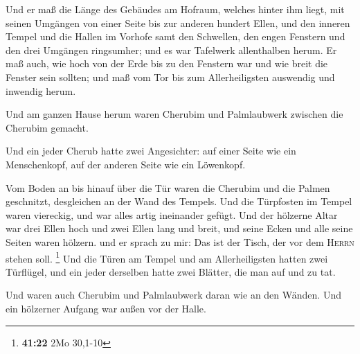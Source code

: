  Und er maß die Länge des Gebäudes am Hofraum, welches
hinter ihm liegt, mit seinen Umgängen von einer Seite bis zur anderen
hundert Ellen, und den inneren Tempel und die Hallen im Vorhofe
 samt den Schwellen, den engen Fenstern und den drei
Umgängen ringsumher; und es war Tafelwerk allenthalben herum.
 Er maß auch, wie hoch von der Erde bis zu den Fenstern
war und wie breit die Fenster sein sollten; und maß vom Tor bis zum
Allerheiligsten auswendig und inwendig herum.

 Und am ganzen Hause herum waren Cherubim und
Palmlaubwerk zwischen die Cherubim gemacht.

 Und ein jeder Cherub hatte zwei Angesichter: auf einer
Seite wie ein Menschenkopf, auf der anderen Seite wie ein Löwenkopf.

 Vom Boden an bis hinauf über die Tür waren die Cherubim
und die Palmen geschnitzt, desgleichen an der Wand des Tempels.
 Und die Türpfosten im Tempel waren viereckig, und war
alles artig ineinander gefügt.  Und der hölzerne Altar
war drei Ellen hoch und zwei Ellen lang und breit, und seine Ecken und
alle seine Seiten waren hölzern. und er sprach zu mir: Das ist der
Tisch, der vor dem \textsc{Herrn} stehen soll. \footnote{\textbf{41:22}
  2Mo 30,1-10}  Und die Türen am Tempel und am
Allerheiligsten  hatten zwei Türflügel, und ein jeder
derselben hatte zwei Blätter, die man auf und zu tat.

 Und waren auch Cherubim und Palmlaubwerk daran wie an
den Wänden. Und ein hölzerner Aufgang war außen vor der Halle.

